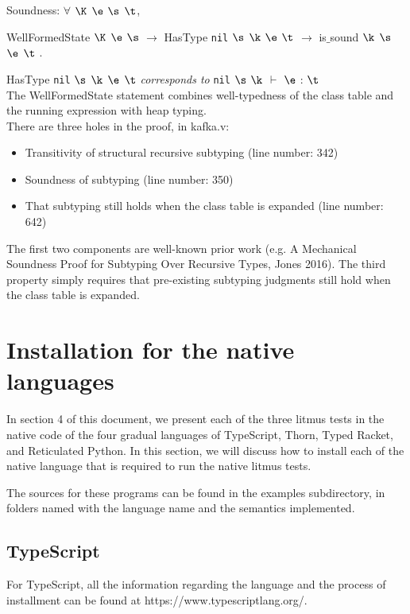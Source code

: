 \documentclass[]{article}
\begin{document}
Soundness: $\forall$ $\K$ $\e$ $\s$ $\t$,

WellFormedState $\K$ $\e$ $\s$ $\rightarrow$ HasType \texttt{nil} $\s$ $\k$ $\e$ $\t$ $\rightarrow$ is$\_$sound $\k$ $\s$ $\e$ $\t$ .

HasType \texttt{nil} $\s$ $\k$ $\e$ $\t$ \textit{corresponds to} \texttt{nil} $\s$ $\k$ $\vdash$ $\e$ : $\t$ \\

The WellFormedState statement combines well-typedness of the class table and the running expression with heap typing. \\

There are three holes in the proof, in kafka.v:
\begin{itemize}
\item Transitivity of structural recursive subtyping (line number: 342)
\item Soundness of subtyping (line number: 350)
\item That subtyping still holds when the class table is expanded (line number: 642)
\end{itemize}
	
The first two components are well-known prior work (e.g. A Mechanical Soundness Proof for Subtyping Over Recursive Types, Jones 2016). 
The third property simply requires that pre-existing subtyping judgments still hold when the class table is expanded.



\section{Installation for the native languages}

In section 4 of this document, we present each of the three litmus tests in
the native code of the four gradual languages of TypeScript, Thorn, Typed
Racket, and Reticulated Python. In this section, we will discuss how to
install each of the native language that is required to run the native litmus
tests.

The sources for these programs can be found in the examples subdirectory, 
in folders named with the language name and the semantics implemented.

\subsection{TypeScript}

For TypeScript, all the information regarding the language and the process of installment can be found at https://www.typescriptlang.org/.
\end{document}
